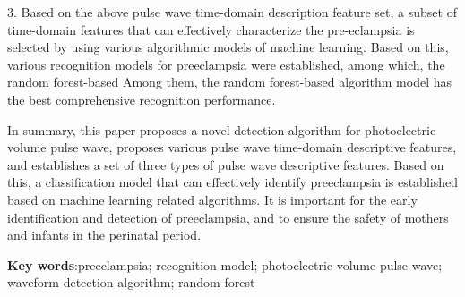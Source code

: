 3. Based on the above pulse wave time-domain description feature set, a subset of time-domain features that can effectively characterize the pre-eclampsia is selected by using various algorithmic models of machine learning. Based on this, various recognition models for preeclampsia were established, among which, the random forest-based
Among them, the random forest-based algorithm model has the best comprehensive recognition performance.

In summary, this paper proposes a novel detection algorithm for photoelectric volume pulse wave, proposes various pulse wave time-domain descriptive features, and establishes a set of three types of pulse wave descriptive features. Based on this, a classification model that can effectively identify preeclampsia is established based on machine learning related algorithms.
It is important for the early identification and detection of preeclampsia, and to ensure the safety of mothers and infants in the perinatal period.


\textbf{Key words}:preeclampsia; recognition model; photoelectric volume pulse wave; waveform detection algorithm; random forest